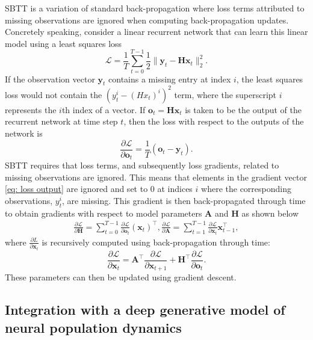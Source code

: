 \documentclass{article}
\newcommand{\vct}[1]{\boldsymbol{#1}}
\newcommand{\vx}{\vct{x}}
\newcommand{\vy}{\vct{y}}
\newcommand{\vo}{\vct{o}}
\newcommand{\mtx}[1]{\boldsymbol{#1}}
\newcommand{\mA}{\mtx{A}}
\newcommand{\mH}{\mtx{H}}
\begin{document}
SBTT is a variation of standard back-propagation where loss terms attributed to missing observations are ignored when computing back-propagation updates. Concretely speaking, consider a linear recurrent network that can learn this linear model using a  least squares loss
\[ \mathcal{L} = \frac{1}{T}\sum_{t=0}^{T-1} \frac{1}{2}\| \vy_t - \mH \vx_t \|_2^2.
\]
If the observation vector $\vy_t$ contains a missing entry at index $i$, the least squares loss would not contain the $(y_t^i - (Hx_t)^i)^2$ term, where the superscript $i$ represents the $i$th index of a vector.  %
 If $\vo_t = \mH\vx_t$ is taken to be the output of the recurrent network at time step $t$, then the loss with respect to the outputs of the network is
\begin{equation}
    \frac{\partial \mathcal{L}}{\partial \vo_t} =  \frac{1}{T}(\vo_t - \vy_t ). \label{eq: loss output} 
\end{equation} 
SBTT requires that loss terms, and subsequently loss gradients, related to missing observations are ignored. This means that elements in the gradient  vector \eqref{eq: loss output} are ignored and set to 0 at  indices $i$ where the corresponding observations, $y_t^i$, are missing. This gradient is then back-propagated through time to obtain gradients with respect to model parameters $\mA$ and $\mH$ as shown below
\begin{align*}
    \frac{\partial \mathcal{L}}{\partial \mH} =  \sum_{t = 0}^{T-1} \frac{\partial \mathcal{L} }{\partial \vo_t}(\vx_t)^\intercal, 
    \frac{\partial \mathcal{L}}{\partial \mA} = \sum_{t= 1}^{T-1} \frac{\partial \mathcal{L}}{\partial \vx_t}\vx_{t-1}^\intercal ,
\end{align*}
where $\frac{\partial L}{\partial \vx_t}$ is recursively computed using back-propagation through time:
\[\frac{\partial \mathcal{L}}{\partial \vx_t} =  \mA^\intercal \frac{\partial \mathcal{L}}{\partial \vx_{t+1}} + \mH^\intercal\frac{\partial \mathcal{L}}{\partial \vo_t} .\]
These parameters can then be updated using gradient descent.
\vspace{3mm}

\subsection{Integration with a deep generative model of neural population dynamics}
\end{document}
